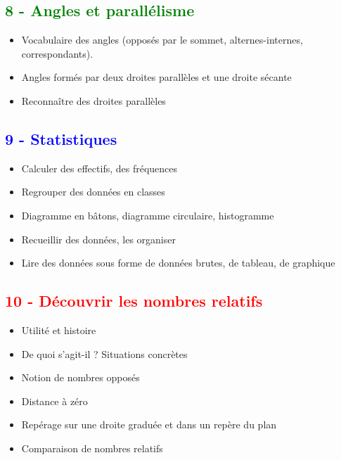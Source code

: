 \documentclass[12pt]{article}
\begin{document}
\newpage

\begin{multicols}{2}

\subsection*{\textcolor{green}{8 - Angles et parallélisme}}

\begin{itemize}
\item Vocabulaire des angles (opposés par le sommet, alternes-internes, correspondants).
\item Angles formés par deux droites parallèles et une droite sécante
\item Reconnaître des droites parallèles
\end{itemize}

\subsection*{\textcolor{blue}{9 - Statistiques}}

\begin{itemize}
\item Calculer des effectifs, des fréquences
\item Regrouper des données en classes
\item Diagramme en bâtons, diagramme circulaire, histogramme
\item Recueillir des données, les organiser
\item Lire des données sous forme de données brutes, de tableau, de graphique
\end{itemize}

\subsection*{\textcolor{red}{10 - Découvrir les nombres relatifs}}

\begin{itemize}
\item Utilité et histoire
\item De quoi s'agit-il ? Situations concrètes
\item Notion de nombres opposés
\item Distance à zéro
\item Repérage sur une droite graduée et dans un repère du plan
\item Comparaison de nombres relatifs
\end{itemize}


\end{multicols}
\end{document}
